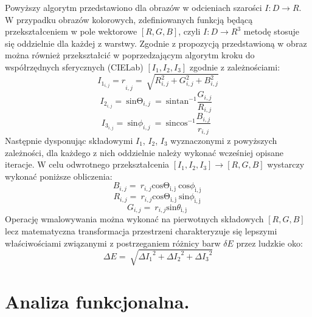\documentclass[12pt, twoside, openany]{report}
\theoremstyle{definition}
\begin{document}
Powyższy algorytm przedstawiono dla obrazów w odcieniach szarości $I:D\to R$. W przypadku obrazów kolorowych, zdefiniowanych funkcją będącą przekształceniem w pole wektorowe $[R,G,B]$, czyli $I:D\to R^3$ metodę stosuje się oddzielnie dla każdej z warstwy. Zgodnie z propozycją przedstawioną w \cite{fishelov2006image} obraz można również przekształcić w poprzedzającym algorytm kroku do współrzędnych sferycznych (CIELab) $\left[I_{1},I_{2},I_{3} \right]$ zgodnie z zależnościami:
\begin{equation}
{I_{1_{i,j}}=r}_{i,j}=\ \sqrt{R^2_{i,j}+G^2_{i,j}+B^2_{i,j}}
\label{TIone}
\end{equation}
\begin{equation}
I_{2_{i,j}}=\ {\mathrm{sin} {\mathrm{\Theta }}_{i,j}\ }=\ {\mathrm{sin} {{\mathrm{tan}}^{-1} \frac{G_{i,j}}{R_{i,j}}\ }\ } 
\label{TItwo}
\end{equation}
\begin{equation}
I_{3_{i,j}}=\ {\mathrm{sin} {\phi }_{i,j}\ }=\ {\mathrm{sin} {{\mathrm{cos}}^{-1} \frac{B_{i,j}}{r_{i,j}}\ }\ } 
\label{TIthree}
\end{equation}
Następnie dysponując składowymi $I_1$, $I_2$, $I_3$ wyznaczonymi z powyższych zależności, dla każdego z nich oddzielnie należy wykonać wcześniej opisane iteracje. W celu odwrotnego przekształcenia $\left[I_1,I_2,I_3 \right]\to\left[R,G,B\right]$ wystarczy wykonać poniższe obliczenia:
\begin{equation}
 B_{i,j}=\ r_{i,j}{\mathrm{cos} {\mathrm{\Theta }}_{\mathrm{i,j}}\ }{\mathrm{cos} {\phi }_{\mathrm{i,j}}\ }
\label{TInvIone}
\end{equation}
\begin{equation}
R_{i,j}=\ r_{i,j}{\mathrm{cos} {\mathrm{\Theta }}_{\mathrm{i,j}}\ }{\mathrm{sin} {\phi }_{\mathrm{i,j}}\ }
\label{TInvItwo}
\end{equation}
\begin{equation}
G_{i,j}=\ r_{i,j}{\mathrm{sin} {\theta }_{\mathrm{i,j}}\ } 
\label{TInvIthree}
\end{equation}
Operację wmalowywania można wykonać na pierwotnych składowych $[R,G,B]$ lecz matematyczna transformacja przestrzeni charakteryzuje się lepszymi właściwościami związanymi z postrzeganiem różnicy barw $\delta E$ przez ludzkie oko:
\begin{equation}
\Delta E=\ \sqrt{{\Delta I_1}^2+{\Delta I_2}^2+{\Delta I_3}^2}
\label{deltaE}
\end{equation}
\chapter{Analiza funkcjonalna.}
\end{document}
